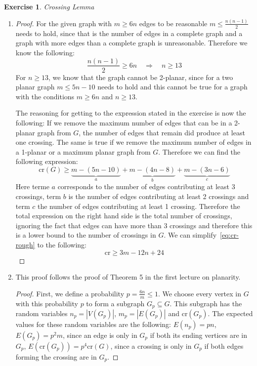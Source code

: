 \documentclass[a4paper,12pt,headsepline]{scrartcl}
\newtheorem{aufgabe}{Exercise}
\begin{document}
\begin{aufgabe}Crossing Lemma
\end{aufgabe}
\begin{enumerate}
  \item
    \begin{proof}
      For the given graph with $m\ge 6n$ edges to be reasonable $m\le \frac{n(n-1)}{2}$ needs to hold, since that is the number of edges in a complete graph and a graph with more edges than a complete graph is unreasonable.
      Therefore we know the following:
      \[ \frac{n(n-1)}{2} \ge 6n \quad\Rightarrow\quad n\ge 13 \]
      For $n\ge 13$, we know that the graph cannot be 2-planar, since for a two planar graph $m\le 5n-10$ needs to hold and this cannot be true for a graph with the conditions $m\ge 6n$ and $n\ge 13$.

      The reasoning for getting to the expression stated in the exercise is now the following:
      If we remove the maximum number of edges that can be in a 2-planar graph from $G$, the number of edges that remain did produce at least one crossing.
      The same is true if we remove the maximum number of edges in a 1-planar or a maximum planar graph from $G$.
      Therefore we can find the following expression:
      \begin{equation}\label{eq:cr-rough}
        \mathrm{cr}(G) \ge \underbrace{m-(5n-10)}_a + \underbrace{m-(4n-8)}_b + \underbrace{m-(3n-6)}_c
      \end{equation}
      Here terme $a$ corresponds to the number of edges contributing at least 3 crossings, term $b$ is the number of edges contributing at least 2 crossings and term $c$ the number of edges contributing at least 1 crossing.
      Therefore the total expression on the right hand side is the total number of crossings, ignoring the fact that edges can have more than 3 crossings and therefore this is a lower bound to the number of crossings in $G$.
      We can simplify~\eqref{eq:cr-rough} to the following:
      \[ \mathrm{cr} \ge 3m - 12n + 24 \]
    \end{proof}
  \item This proof follows the proof of Theorem 5 in the first lecture on planarity.
    \begin{proof}
      First, we define a probability $p=\frac{6n}{m}\le 1$.
      We choose every vertex in $G$ with this probability $p$ to form a subgraph $G_p\subseteq G$.
      This subgraph has the random variables $n_p=|V(G_p)|$, $m_p=|E(G_p)|$ and $\mathrm{cr}(G_p)$.
      The expected values for these random variables are the following: $E(n_p)=pn$, $E(G_p)=p^2m$, since an edge is only in $G_p$ if both its ending vertices are in $G_p$, $E(\mathrm{cr}(G_p))=p^4\mathrm{cr}(G)$, since a crossing is only in $G_p$ if both edges forming the crossing are in $G_p$.


\end{proof}
\end{enumerate}
\end{document}
